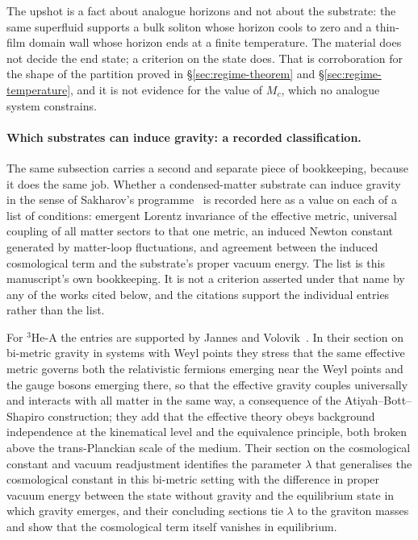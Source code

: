 \documentclass[aps,prd,nofootinbib,superscriptaddress,12pt]{revtex4-2}
\begin{document}
The upshot is a fact about analogue horizons and not about the substrate: the
same superfluid supports a bulk soliton whose horizon cools to zero and a
thin-film domain wall whose horizon ends at a finite temperature. The material
does not decide the end state; a criterion on the state does. That is
corroboration for the shape of the partition proved in
\S\ref{sec:regime-theorem} and \S\ref{sec:regime-temperature}, and it is
not evidence for the value of $M_c$, which no analogue system constrains.

\paragraph{Which substrates can induce gravity: a recorded classification.}
The same subsection carries a second and separate piece of bookkeeping, because
it does the same job. Whether a condensed-matter substrate can induce gravity
in the sense of Sakharov's programme~\cite{Sakharov1968} is recorded here as a
value on each of a list of conditions: emergent Lorentz invariance of the
effective metric, universal coupling of all matter sectors to that one metric,
an induced Newton constant generated by matter-loop fluctuations, and agreement
between the induced cosmological term and the substrate's proper vacuum energy.
The list is this manuscript's own bookkeeping. It is not a criterion asserted
under that name by any of the works cited below, and the citations support the
individual entries rather than the list.

For $^{3}$He-A the entries are supported by Jannes and
Volovik~\cite{JannesVolovik2012}. In their section on bi-metric gravity in
systems with Weyl points they stress that the same effective metric governs
both the relativistic fermions emerging near the Weyl points and the gauge
bosons emerging there, so that the effective gravity couples universally and
interacts with all matter in the same way, a consequence of the
Atiyah--Bott--Shapiro construction; they add that the effective theory obeys
background independence at the kinematical level and the equivalence principle,
both broken above the trans-Planckian scale of the medium. Their section on the
cosmological constant and vacuum readjustment identifies the parameter
$\lambda$ that generalises the cosmological constant in this bi-metric setting
with the difference in proper vacuum energy between the state without gravity
and the equilibrium state in which gravity emerges, and their concluding
sections tie $\lambda$ to the graviton masses and show that the cosmological
term itself vanishes in equilibrium.
\end{document}
